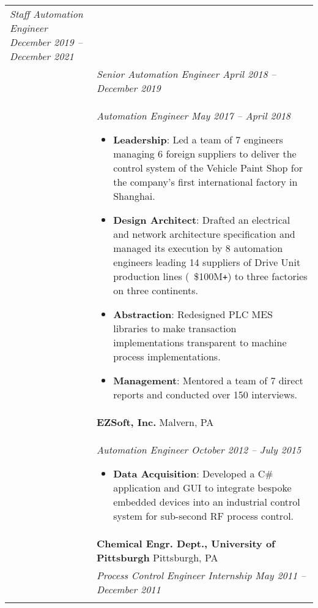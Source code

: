 \documentclass[11pt]{article}
\begin{document}
\begin{tabular}[t]{@{}p{1.05in} @{}p{6.00in}}
    \textit{Staff Automation Engineer \hfill December 2019 -- December 2021}
\\ &
 
    \textit{Senior Automation Engineer \hfill April 2018 -- December 2019}
\\ &
 
    \textit{Automation Engineer \hfill May 2017 -- April 2018}
        \begin{itemize}[noitemsep,topsep=0pt]
            \item \textbf{Leadership}: Led a team of 7 engineers managing 6 foreign suppliers to deliver the control system of the Vehicle Paint Shop for the company's first international factory in Shanghai.%
            \item \textbf{Design Architect}: Drafted an electrical and network architecture specification and managed its execution by 8 automation engineers leading 14 suppliers of Drive Unit production lines (~\$100M\verb!+!) to three factories on three continents.%
            \item \textbf{Abstraction}: Redesigned PLC MES libraries to make transaction implementations transparent to machine process implementations.%
            \item \textbf{Management}: Mentored a team of 7 direct reports and conducted over 150 interviews.%
        \end{itemize}
\\
&
\textbf{EZSoft, Inc.}  \hfill Malvern, PA \\ &
 
    \textit{Automation Engineer \hfill October 2012 -- July 2015}
        \begin{itemize}[noitemsep,topsep=0pt]
            \item \textbf{Data Acquisition}: Developed a C\# application and GUI to integrate bespoke embedded devices into an industrial control system for sub-second RF process control.%
        \end{itemize}
\\
&
\textbf{Chemical Engr. Dept., University of Pittsburgh}  \hfill Pittsburgh, PA \\ &
 
    \textit{Process Control Engineer Internship \hfill May 2011 -- December 2011}
\\
\\


\end{tabular}
\end{document}
